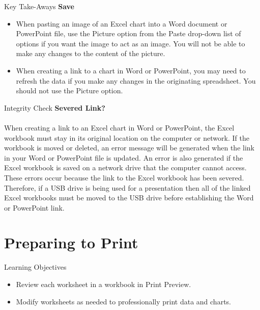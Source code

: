 \begin{center}
	\begin{tkwbox}{Key Take-Aways}
		\textbf{Save}
		\\
		\begin{itemize}
			\setlength{\itemsep}{0pt}
			\setlength{\parskip}{0pt}
			\setlength{\parsep}{0pt}

			\item When pasting an image of an Excel chart into a Word document or PowerPoint file, use the Picture option from the Paste drop-down list of options if you want the image to act as an image. You will not be able to make any changes to the content of the picture.
			\item When creating a link to a chart in Word or PowerPoint, you may need to refresh the data if you make any changes in the originating spreadsheet. You should not use the Picture option.
					
		\end{itemize}
	\end{tkwbox}
\end{center}

\begin{center}
	\begin{infobox}{Integrity Check}
		\textbf{Severed Link?}
		\\
		\\
		When creating a link to an Excel chart in Word or PowerPoint, the Excel workbook must stay in its original location on the computer or network. If the workbook is moved or deleted, an error message will be generated when the link in your Word or PowerPoint file is updated. An error is also generated if the Excel workbook is saved on a network drive that the computer cannot access. These errors occur because the link to the Excel workbook has been severed. Therefore, if a USB drive is being used for a presentation then all of the linked Excel workbooks must be moved to the USB drive before establishing the Word or PowerPoint link.
	\end{infobox}
\end{center}


\section{Preparing to Print}


\begin{center}
	\begin{objbox}{Learning Objectives}
		\begin{itemize}
			\setlength{\itemsep}{0pt}
			\setlength{\parskip}{0pt}
			\setlength{\parsep}{0pt}

			\item Review each worksheet in a workbook in Print Preview.
			\item Modify worksheets as needed to professionally print data and charts.
			
		\end{itemize}
	\end{objbox}
\end{center}


